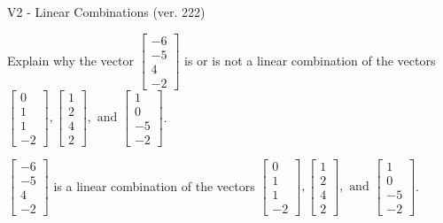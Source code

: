 \begin{exercise}
  \begin{exerciseTitle}V2 - Linear Combinations (ver. 222)\end{exerciseTitle}
  \begin{exerciseStatement}
    Explain why the vector \(\left[\begin{array}{c}
-6 \\
-5 \\
4 \\
-2
\end{array}\right]\)  is or is not a linear 
	combination of the vectors \(\left[\begin{array}{c}
0 \\
1 \\
1 \\
-2
\end{array}\right] , \left[\begin{array}{c}
1 \\
2 \\
4 \\
2
\end{array}\right] , \text{ and } \left[\begin{array}{c}
1 \\
0 \\
-5 \\
-2
\end{array}\right]\).
	


  \end{exerciseStatement}
  \begin{exerciseAnswer}
   \(\left[\begin{array}{c}
-6 \\
-5 \\
4 \\
-2
\end{array}\right]\) 
  	 is  
	a linear combination of the vectors \(\left[\begin{array}{c}
0 \\
1 \\
1 \\
-2
\end{array}\right] , \left[\begin{array}{c}
1 \\
2 \\
4 \\
2
\end{array}\right] , \text{ and } \left[\begin{array}{c}
1 \\
0 \\
-5 \\
-2
\end{array}\right]\).

	
  


  \end{exerciseAnswer}
\end{exercise}